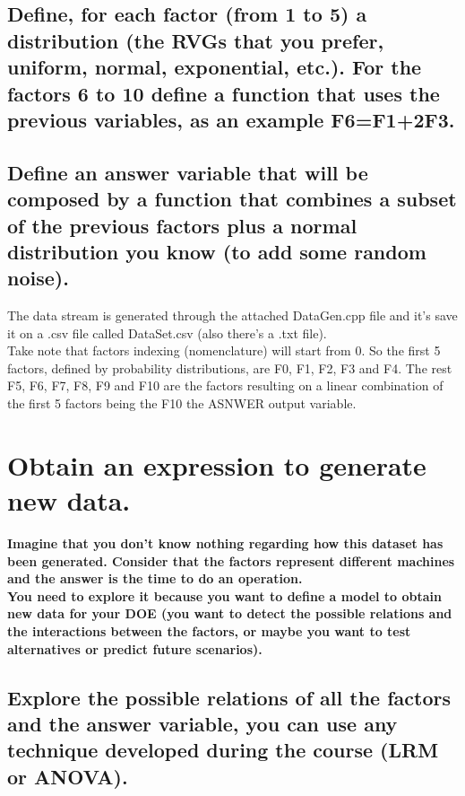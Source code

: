 \documentclass[12pt]{article}
\begin{document}
\subsection {Define, for each factor (from 1 to 5) a distribution (the RVGs that you prefer, uniform, normal, exponential, etc.). For the factors 6 to 10 define a function that uses the previous variables, as an example F6=F1+2F3.}
\subsection {Define an answer variable that will be composed by a function that combines a subset of the previous factors plus a normal distribution you know (to add some random noise).}
The data stream is generated through the attached DataGen.cpp file and it's save it on a .csv file called DataSet.csv (also there's a .txt file).\\
Take note that factors indexing (nomenclature) will start from 0. So the first 5 factors, defined by probability distributions, are F0, F1, F2, F3 and F4. The rest F5, F6, F7, F8, F9 and F10 are the factors resulting on a linear combination of the first 5 factors being the F10 the ASNWER output variable.

\section {Obtain an expression to generate new data.}
\vspace{5mm}
\textbf{Imagine that you don’t know nothing regarding how this dataset has been generated. Consider that the factors represent different machines and the answer is the time to do an operation.\\
You need to explore it because you want to define a model to obtain new data for your DOE (you want to detect the possible relations and the interactions between the factors, or maybe you want to test alternatives or predict future scenarios).}
\subsection {Explore the possible relations of all the factors and the answer variable, you can use any technique developed during the course (LRM or ANOVA).}
\end{document}
